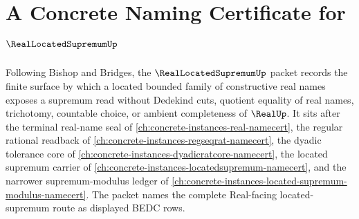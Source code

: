\chapter{A Concrete Naming Certificate for $\RealLocatedSupremumUp$}
\label{ch:concrete-instances-real-located-supremum-namecert}

Following Bishop and Bridges, the $\RealLocatedSupremumUp$ packet records the finite surface by which a located bounded family of constructive real names exposes a supremum read without Dedekind cuts, quotient equality of real names, trichotomy, countable choice, or ambient completeness of $\RealUp$. It sits after the terminal real-name seal of \autoref{ch:concrete-instances-real-namecert}, the regular rational readback of \autoref{ch:concrete-instances-regseqrat-namecert}, the dyadic tolerance core of \autoref{ch:concrete-instances-dyadicratcore-namecert}, the located supremum carrier of \autoref{ch:concrete-instances-locatedsupremum-namecert}, and the narrower supremum-modulus ledger of \autoref{ch:concrete-instances-located-supremum-modulus-namecert}. The packet names the complete Real-facing located-supremum route as displayed BEDC rows.

